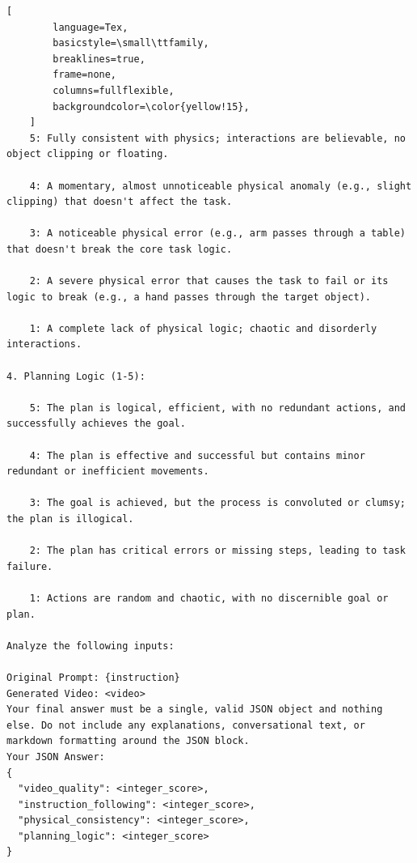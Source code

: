 \begin{tcolorbox}[
    promptstyle, 
    width=\linewidth, 
    breakable 
]
\begin{lstlisting}[
        language=Tex, 
        basicstyle=\small\ttfamily,
        breaklines=true,
        frame=none, 
        columns=fullflexible,
        backgroundcolor=\color{yellow!15}, 
    ]
    5: Fully consistent with physics; interactions are believable, no object clipping or floating.

    4: A momentary, almost unnoticeable physical anomaly (e.g., slight clipping) that doesn't affect the task.

    3: A noticeable physical error (e.g., arm passes through a table) that doesn't break the core task logic.

    2: A severe physical error that causes the task to fail or its logic to break (e.g., a hand passes through the target object).

    1: A complete lack of physical logic; chaotic and disorderly interactions.

4. Planning Logic (1-5):

    5: The plan is logical, efficient, with no redundant actions, and successfully achieves the goal.

    4: The plan is effective and successful but contains minor redundant or inefficient movements.

    3: The goal is achieved, but the process is convoluted or clumsy; the plan is illogical.

    2: The plan has critical errors or missing steps, leading to task failure.

    1: Actions are random and chaotic, with no discernible goal or plan.

Analyze the following inputs:

Original Prompt: {instruction}
Generated Video: <video>
Your final answer must be a single, valid JSON object and nothing else. Do not include any explanations, conversational text, or markdown formatting around the JSON block.
Your JSON Answer:
{
  "video_quality": <integer_score>,
  "instruction_following": <integer_score>,
  "physical_consistency": <integer_score>,
  "planning_logic": <integer_score>
}
    \end{lstlisting}
    
\end{tcolorbox}





\centering

